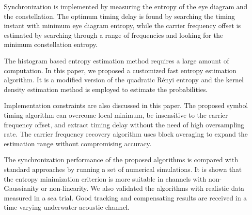 \documentclass[journal,comsoc,onecolumn, 12pt,draftclsnofoot]{IEEEtran}
\begin{document}
Synchronization is implemented by measuring the entropy of the eye diagram and the constellation.
% 
% 
The optimum timing delay is found by searching the timing instant with minimum eye diagram entropy, while the carrier frequency offset is estimated by searching through a range of frequencies and looking for the minimum constellation entropy.  

The histogram based entropy estimation method requires a large amount of computation.
In this paper, we proposed a customized fast entropy estimation algorithm.
It is a modified version of the quadratic R\'enyi entropy and the kernel density estimation method is employed to estimate the probabilities.

Implementation constraints are also discussed in this paper. 
The proposed symbol timing algorithm can overcome local minimum, be insensitive to the carrier frequency offset, and extract timing delay without the need of high oversampling rate.
The carrier frequency recovery algorithm uses block averaging to expand the estimation range without compromising accuracy. 

The synchronization performance of the proposed algorithms is compared with standard approaches by running a set of numerical simulations.
It is shown that the entropy minimization criterion is more suitable in channels with  non-Gaussianity or non-linearity.
% 
% 
We also validated the algorithms with realistic data measured in a sea trial.
Good tracking and compensating results are received in a time varying underwater acoustic channel.


\end{document}
